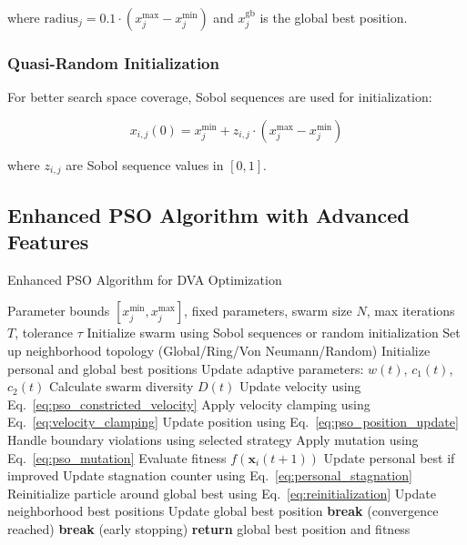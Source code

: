 \documentclass[12pt,a4paper]{article}
\begin{document}
where $\text{radius}_j = 0.1 \cdot (x_j^{\max} - x_j^{\min})$ and $x_{j}^{\text{gb}}$ is the global best position.

\subsubsection{Quasi-Random Initialization}

For better search space coverage, Sobol sequences are used for initialization:

\begin{equation}
x_{i,j}(0) = x_j^{\min} + z_{i,j} \cdot (x_j^{\max} - x_j^{\min}) \label{eq:sobol_initialization}
\end{equation}

where $z_{i,j}$ are Sobol sequence values in $[0,1]$.

\subsection{Enhanced PSO Algorithm with Advanced Features}

\begin{algorithm}[H]
\caption{Enhanced PSO Algorithm for DVA Optimization}
\begin{algorithmic}[1]
\REQUIRE Parameter bounds $[x_j^{\min}, x_j^{\max}]$, fixed parameters, swarm size $N$, max iterations $T$, tolerance $\tau$
\STATE Initialize swarm using Sobol sequences or random initialization
\STATE Set up neighborhood topology (Global/Ring/Von Neumann/Random)
\STATE Initialize personal and global best positions
    \STATE Update adaptive parameters: $w(t)$, $c_1(t)$, $c_2(t)$
    \STATE Calculate swarm diversity $D(t)$
        \STATE Update velocity using Eq.~\eqref{eq:pso_constricted_velocity}
        \STATE Apply velocity clamping using Eq.~\eqref{eq:velocity_clamping}
        \STATE Update position using Eq.~\eqref{eq:pso_position_update}
        \STATE Handle boundary violations using selected strategy
            \STATE Apply mutation using Eq.~\eqref{eq:pso_mutation}
        \ENDIF
        \STATE Evaluate fitness $f(\mathbf{x}_i(t+1))$
        \STATE Update personal best if improved
        \STATE Update stagnation counter using Eq.~\eqref{eq:personal_stagnation}
            \STATE Reinitialize particle around global best using Eq.~\eqref{eq:reinitialization}
        \ENDIF
    \ENDFOR
    \STATE Update neighborhood best positions
    \STATE Update global best position
        \STATE \textbf{break} (convergence reached)
    \ENDIF
        \STATE \textbf{break} (early stopping)
    \ENDIF
\ENDFOR
\STATE \textbf{return} global best position and fitness
\end{algorithmic}
\end{algorithm}
\end{document}
